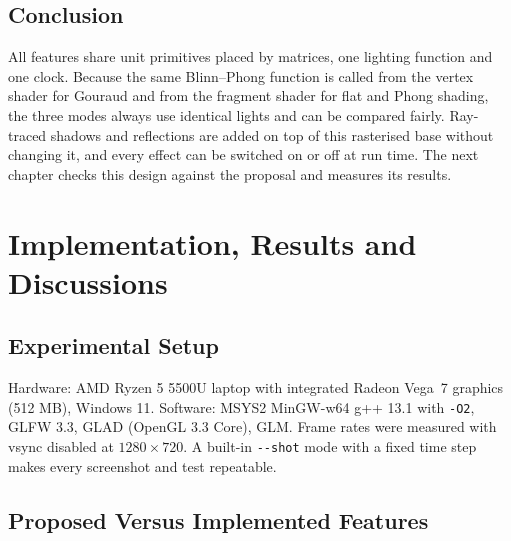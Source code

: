 \documentclass[12pt, a4paper]{report}
\begin{document}
\section{Conclusion}

\begin{justify}
  {\fontsize{12}{13.8}\selectfont
    All features share unit primitives placed by matrices, one lighting function and one clock. Because the same Blinn--Phong function is called from the vertex shader for Gouraud and from the fragment shader for flat and Phong shading, the three modes always use identical lights and can be compared fairly. Ray-traced shadows and reflections are added on top of this rasterised base without changing it, and every effect can be switched on or off at run time. The next chapter checks this design against the proposal and measures its results.
  }
\end{justify}

\chapter{Implementation, Results and Discussions}

\section{Experimental Setup}

\begin{justify}
  {\fontsize{12}{13.8}\selectfont
    Hardware: AMD Ryzen 5 5500U laptop with integrated Radeon Vega~7 graphics (512 MB), Windows 11. Software: MSYS2 MinGW-w64 g++ 13.1 with \texttt{-O2}, GLFW 3.3, GLAD (OpenGL 3.3 Core), GLM. Frame rates were measured with vsync disabled at $1280\times720$. A built-in \texttt{-{}-shot} mode with a fixed time step makes every screenshot and test repeatable.
  }
\end{justify}

\section{Proposed Versus Implemented Features}
\end{document}
